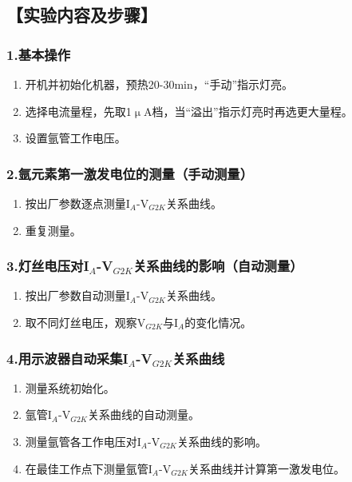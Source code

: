 \documentclass[12pt,a4paper,UTF8]{ctexart}
\begin{document}
\subsection*{【实验内容及步骤】}

	\subsubsection*{1.基本操作}
	\begin{enumerate}[(1)]
			\item 开机并初始化机器，预热20-30min，“手动”指示灯亮。
			\item 选择电流量程，先取1$\upmu$A档，当“溢出”指示灯亮时再选更大量程。
			\item 设置氩管工作电压。
	\end{enumerate}

	\subsubsection*{2.氩元素第一激发电位的测量（手动测量）}
	\begin{enumerate}[(1)]
		\item 按出厂参数逐点测量I$_A$-V$_{G2K}$关系曲线。
		\item 重复测量。
	\end{enumerate}

	\subsubsection*{3.灯丝电压对I$_A$-V$_{G2K}$关系曲线的影响（自动测量）}
	\begin{enumerate}[(1)]
		\item 按出厂参数自动测量I$_A$-V$_{G2K}$关系曲线。
		\item 取不同灯丝电压，观察V$_{G2K}$与I$_A$的变化情况。
	\end{enumerate}

	\subsubsection*{4.用示波器自动采集I$_A$-V$_{G2K}$关系曲线}
	\begin{enumerate}[(1)]
		\item 测量系统初始化。
		\item 氩管I$_A$-V$_{G2K}$关系曲线的自动测量。
		\item 测量氩管各工作电压对I$_A$-V$_{G2K}$关系曲线的影响。
		\item 在最佳工作点下测量氩管I$_A$-V$_{G2K}$关系曲线并计算第一激发电位。
	\end{enumerate}
\end{document}
